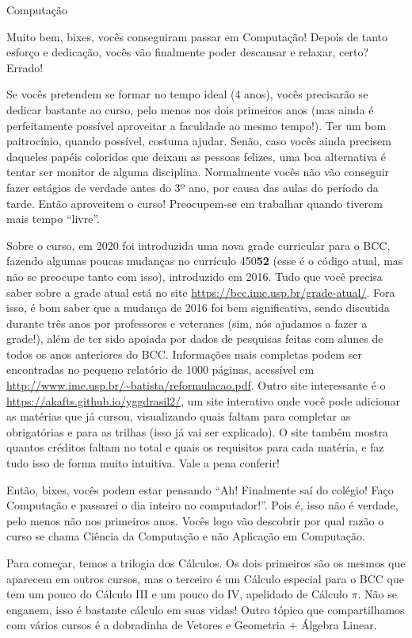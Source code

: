 \begin{subsecao}{Computação}

Muito bem, bixes, vocês conseguiram passar em Computação! Depois de tanto
esforço e dedicação, vocês vão finalmente poder descansar e relaxar, certo?
Errado!

Se vocês pretendem se formar no tempo ideal (4 anos), vocês precisarão se
dedicar bastante ao curso, pelo menos nos dois primeiros anos (mas ainda é
perfeitamente possível aproveitar a faculdade ao mesmo tempo!). Ter um bom
paitrocínio, quando possível, costuma ajudar. Senão, caso vocês ainda precisem
daqueles papéis coloridos que deixam as pessoas felizes, uma boa alternativa é
tentar ser monitor de alguma disciplina. Normalmente vocês não vão conseguir 
fazer estágios de verdade antes do 3º ano, por causa das aulas do período da tarde. 
Então aproveitem o curso! Preocupem-se em trabalhar quando tiverem mais tempo ``livre''.

Sobre o curso, em 2020 foi introduzida uma nova grade curricular para o BCC,
fazendo algumas poucas mudanças no currículo 450\textbf{52} (esse é o código
atual, mas não se preocupe tanto com isso), introduzido em 2016. Tudo que você
precisa saber sobre a grade atual está no site
\url{https://bcc.ime.usp.br/grade-atual/}.
Fora isso, é bom saber que a mudança de 2016 foi bem significativa, sendo
discutida durante três anos por professores e veteranes (sim, nós ajudamos a
fazer a grade!), além de ter sido apoiada por dados de pesquisas feitas com
alunes de todos os anos anteriores do BCC. Informações mais completas podem
ser encontradas no pequeno relatório de 1000 páginas, acessível em
\url{http://www.ime.usp.br/~batista/reformulacao.pdf}. Outro site interessante é o 
\url{https://akafts.github.io/yggdrasil2/}, um
site interativo onde você pode adicionar as matérias que já cursou,
visualizando quais faltam para completar as obrigatórias e para as trilhas
(isso já vai ser explicado). O site também mostra quantos créditos faltam no
total e quais os requisitos para cada matéria, e faz tudo isso de forma muito
intuitiva. Vale a pena conferir!

Então, bixes, vocês podem estar pensando ``Ah! Finalmente saí do colégio! Faço
Computação e passarei o dia inteiro no computador!''. Pois é, isso não é
verdade, pelo menos não nos primeiros anos. Vocês logo vão descobrir por qual
razão o curso se chama Ciência da Computação e não Aplicação em Computação.

Para começar, temos a trilogia dos Cálculos. Os dois primeiros são os mesmos
que aparecem em outros cursos, mas o terceiro é um Cálculo especial para o BCC
que tem um pouco do Cálculo III e um pouco do IV, apelidado de Cálculo $\pi$.
Não se enganem, isso é bastante cálculo em suas vidas! Outro tópico que
compartilhamos com vários cursos é a dobradinha de Vetores e Geometria $+$
Álgebra Linear. 


\end{subsecao}
